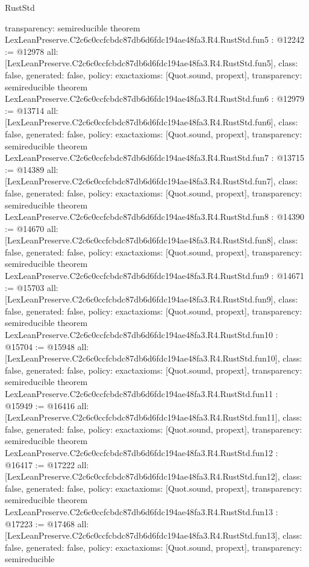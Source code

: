 \begin{lexlean}{RustStd}
\begin{coremodule}
{  transparency: semireducible
}
theorem LexLeanPreserve.C2c6c0ccfcbdc87db6d6fdc194ae48fa3.R4.RustStd.fun5 : @12242 := @12978 {
  all: [LexLeanPreserve.C2c6c0ccfcbdc87db6d6fdc194ae48fa3.R4.RustStd.fun5],
  class: false,
  generated: false,
  policy: exact{axioms: [Quot.sound, propext]},
  transparency: semireducible
}
theorem LexLeanPreserve.C2c6c0ccfcbdc87db6d6fdc194ae48fa3.R4.RustStd.fun6 : @12979 := @13714 {
  all: [LexLeanPreserve.C2c6c0ccfcbdc87db6d6fdc194ae48fa3.R4.RustStd.fun6],
  class: false,
  generated: false,
  policy: exact{axioms: [Quot.sound, propext]},
  transparency: semireducible
}
theorem LexLeanPreserve.C2c6c0ccfcbdc87db6d6fdc194ae48fa3.R4.RustStd.fun7 : @13715 := @14389 {
  all: [LexLeanPreserve.C2c6c0ccfcbdc87db6d6fdc194ae48fa3.R4.RustStd.fun7],
  class: false,
  generated: false,
  policy: exact{axioms: [Quot.sound, propext]},
  transparency: semireducible
}
theorem LexLeanPreserve.C2c6c0ccfcbdc87db6d6fdc194ae48fa3.R4.RustStd.fun8 : @14390 := @14670 {
  all: [LexLeanPreserve.C2c6c0ccfcbdc87db6d6fdc194ae48fa3.R4.RustStd.fun8],
  class: false,
  generated: false,
  policy: exact{axioms: [Quot.sound, propext]},
  transparency: semireducible
}
theorem LexLeanPreserve.C2c6c0ccfcbdc87db6d6fdc194ae48fa3.R4.RustStd.fun9 : @14671 := @15703 {
  all: [LexLeanPreserve.C2c6c0ccfcbdc87db6d6fdc194ae48fa3.R4.RustStd.fun9],
  class: false,
  generated: false,
  policy: exact{axioms: [Quot.sound, propext]},
  transparency: semireducible
}
theorem LexLeanPreserve.C2c6c0ccfcbdc87db6d6fdc194ae48fa3.R4.RustStd.fun10 : @15704 := @15948 {
  all: [LexLeanPreserve.C2c6c0ccfcbdc87db6d6fdc194ae48fa3.R4.RustStd.fun10],
  class: false,
  generated: false,
  policy: exact{axioms: [Quot.sound, propext]},
  transparency: semireducible
}
theorem LexLeanPreserve.C2c6c0ccfcbdc87db6d6fdc194ae48fa3.R4.RustStd.fun11 : @15949 := @16416 {
  all: [LexLeanPreserve.C2c6c0ccfcbdc87db6d6fdc194ae48fa3.R4.RustStd.fun11],
  class: false,
  generated: false,
  policy: exact{axioms: [Quot.sound, propext]},
  transparency: semireducible
}
theorem LexLeanPreserve.C2c6c0ccfcbdc87db6d6fdc194ae48fa3.R4.RustStd.fun12 : @16417 := @17222 {
  all: [LexLeanPreserve.C2c6c0ccfcbdc87db6d6fdc194ae48fa3.R4.RustStd.fun12],
  class: false,
  generated: false,
  policy: exact{axioms: [Quot.sound, propext]},
  transparency: semireducible
}
theorem LexLeanPreserve.C2c6c0ccfcbdc87db6d6fdc194ae48fa3.R4.RustStd.fun13 : @17223 := @17468 {
  all: [LexLeanPreserve.C2c6c0ccfcbdc87db6d6fdc194ae48fa3.R4.RustStd.fun13],
  class: false,
  generated: false,
  policy: exact{axioms: [Quot.sound, propext]},
  transparency: semireducible
}
\end{coremodule}
\end{lexlean}
